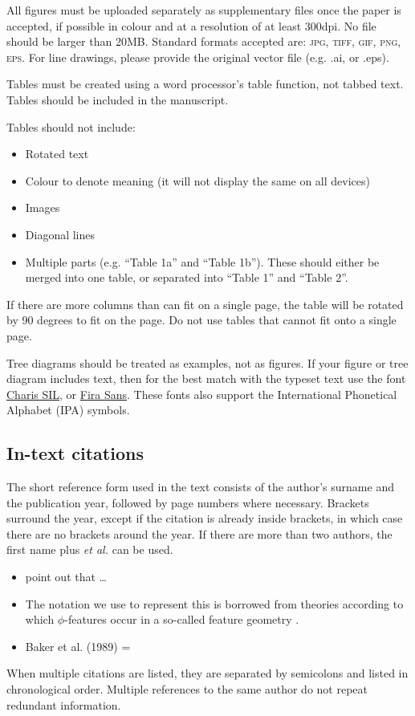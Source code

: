 \documentclass[charis,linguex]{glossa}
\begin{document}
All figures must be uploaded separately as supplementary files once the paper is accepted, if possible in colour and at a resolution of at least 300dpi. No file should be larger than 20MB. Standard formats accepted are: \textsc{jpg, tiff, gif, png, eps}. For line drawings, please provide the original vector file (e.g. .ai, or .eps).

Tables must be created using a word processor's table function, not tabbed text. Tables should be included in the manuscript. 

Tables should not include:

\begin{itemize}
\item Rotated text
\item Colour to denote meaning (it will not display the same on all devices)
\item Images
\item Diagonal lines
\item Multiple parts (e.g. ``Table 1a'' and ``Table 1b''). These should either be merged into one table, or separated into ``Table 1'' and ``Table 2''.
\end{itemize}
If there are more columns than can fit on a single page, the table will be rotated by 90 degrees to fit on the page. Do not use tables that cannot fit onto a single page.

Tree diagrams should be treated as examples, not as figures. If your figure or tree diagram includes text, then for the best match with the typeset text use the font \href{https://software.sil.org/charis/download/}{Charis SIL}, or \href{https://www.fontsquirrel.com/fonts/fira-sans}{Fira Sans}. These fonts also support the International Phonetical Alphabet (IPA) symbols.


\subsection{In-text citations}

The short reference form used in the text consists of the author’s surname and the publication year, followed by page numbers where necessary. Brackets surround the year, except if the citation is already inside brackets, in which case there are no brackets around the year. If there are more than two authors, the first name plus \textit{et al.} can be used.

\begin{itemize}
\item \citet{murray:1983} point out that \ldots
\item The notation we use to represent this is borrowed from theories according to which $\phi$-features occur in a so-called feature geometry \citep[248-250]{mccarthy:1999}.
\item Baker et al. (1989) = \citet*{baker:1989}
\end{itemize}
When multiple citations are listed, they are separated by semicolons and listed in chronological order. Multiple references to the same author do not repeat redundant information.
\end{document}
